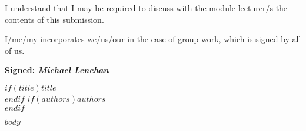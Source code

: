 \documentclass[12pt,a4paper]{scrartcl}
\begin{document}
\begin{titlepage}
\begin{bfseries}
    I understand that I may be required to discuss with
    the module lecturer/s the contents of this submission.
    
    I/me/my incorporates
    we/us/our in the case of group work, which is signed by all of us.
    \end{bfseries}

    \textbf{Signed: \underline{\textit{Michael Lenehan}}}
    
\end{titlepage}

\begin{center}
  \hfill \break%
  $if(title)$\Huge{$title$}\\[0.5em]$endif$
  $if(authors)$\Large{$authors$}\\[2.5em]$endif$
\end{center}

$body$
\end{document}
